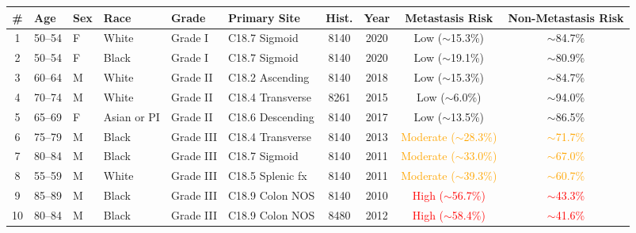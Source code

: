 \documentclass[11pt, a4paper]{article}
\begin{document}
\vspace{4pt}
\begin{center}
\footnotesize
\begin{tabular}{@{}clllllcccc@{}}
\toprule
\textbf{\#} & \textbf{Age} & \textbf{Sex} & \textbf{Race} & \textbf{Grade} &
\textbf{Primary Site} & \textbf{Hist.} & \textbf{Year} &
\textbf{Metastasis Risk} & \textbf{Non-Metastasis Risk} \\
\midrule

1 & 50–54 & F & White & Grade I   & C18.7 Sigmoid    & 8140 & 2020 &
\textcolor{successgreen}{Low ($\sim$15.3\%)} & \textcolor{successgreen}{$\sim$84.7\%} \\[4pt]

2 & 50–54 & F & Black & Grade I   & C18.7 Sigmoid    & 8140 & 2020 &
\textcolor{successgreen}{Low ($\sim$19.1\%)} & \textcolor{successgreen}{$\sim$80.9\%} \\[4pt]

3 & 60–64 & M & White & Grade II  & C18.2 Ascending  & 8140 & 2018 &
\textcolor{successgreen}{Low ($\sim$15.3\%)} & \textcolor{successgreen}{$\sim$84.7\%} \\[4pt]

4 & 70–74 & M & White & Grade II  & C18.4 Transverse & 8261 & 2015 &
\textcolor{successgreen}{Low ($\sim$6.0\%)}  & \textcolor{successgreen}{$\sim$94.0\%} \\[4pt]

5 & 65–69 & F & Asian or PI & Grade II & C18.6 Descending & 8140 & 2017 &
\textcolor{successgreen}{Low ($\sim$13.5\%)} & \textcolor{successgreen}{$\sim$86.5\%} \\[4pt]

6 & 75–79 & M & Black & Grade III & C18.4 Transverse & 8140 & 2013 &
\textcolor{orange}{Moderate ($\sim$28.3\%)}  & \textcolor{orange}{$\sim$71.7\%} \\[4pt]

7 & 80–84 & M & Black & Grade III & C18.7 Sigmoid    & 8140 & 2011 &
\textcolor{orange}{Moderate ($\sim$33.0\%)}  & \textcolor{orange}{$\sim$67.0\%} \\[4pt]

8 & 55–59 & M & White & Grade III & C18.5 Splenic fx & 8140 & 2011 &
\textcolor{orange}{Moderate ($\sim$39.3\%)}  & \textcolor{orange}{$\sim$60.7\%} \\[4pt]

9 & 85–89 & M & Black & Grade III & C18.9 Colon NOS  & 8140 & 2010 &
\textcolor{red}{High ($\sim$56.7\%)}         & \textcolor{red}{$\sim$43.3\%} \\[4pt]

10 & 80–84 & M & Black & Grade III & C18.9 Colon NOS & 8480 & 2012 &
\textcolor{red}{High ($\sim$58.4\%)}         & \textcolor{red}{$\sim$41.6\%} \\[4pt]

\bottomrule
\end{tabular}
\end{center}
\end{document}
